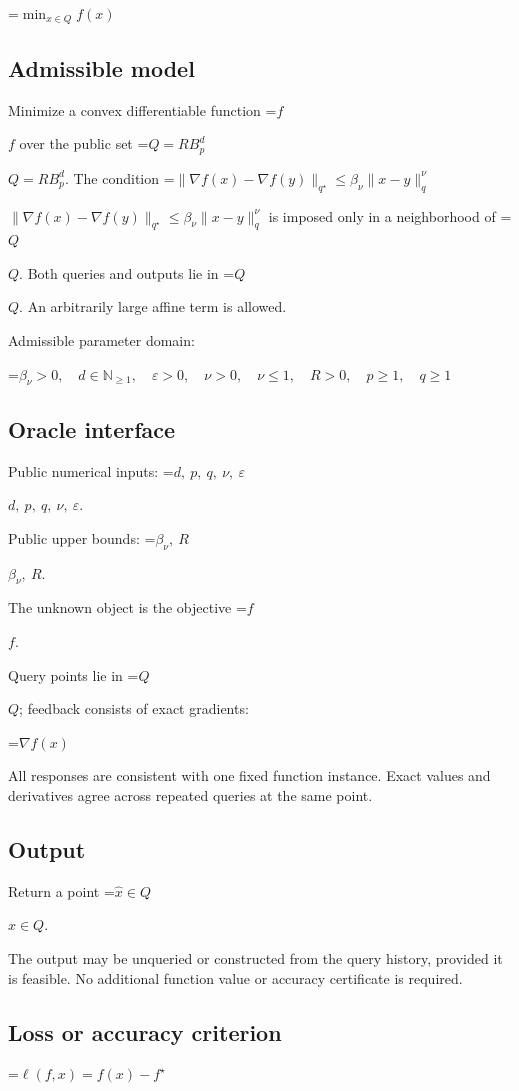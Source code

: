 \documentclass[10pt,a4paper]{article}
\newcommand{\AtlasMath}[1]{\par\begingroup\centering\setbox0=\hbox{$\displaystyle #1$}\ifdim\wd0>1.4\linewidth\typeout{ATLAS WIDE FORMULA: \the\wd0}\fi\ifdim\wd0>\linewidth\resizebox{\linewidth}{!}{\box0}\else\box0\fi\par\endgroup}
\newcommand{\AtlasInlineMath}[1]{\begingroup\setbox0=\hbox{$#1$}\ifdim\wd0>.4\linewidth\endgroup\AtlasMath{#1}\else\endgroup$#1$\fi}
\begin{document}
\AtlasMath{\min_{x\in Q}f(x)}


\subsection{Admissible model}
Minimize a convex differentiable function \AtlasInlineMath{f} over the public set \AtlasInlineMath{Q=RB_p^d}. The condition \AtlasInlineMath{\|\nabla f(x)-\nabla f(y)\|_{q^\star}\le\beta_\nu\|x-y\|_q^\nu} is imposed only in a neighborhood of \AtlasInlineMath{Q}. Both queries and outputs lie in \AtlasInlineMath{Q}. An arbitrarily large affine term is allowed.

Admissible parameter domain:


\AtlasMath{\beta_\nu>0,\quad d\in\mathbb{N}_{\ge1},\quad \varepsilon>0,\quad \nu>0,\quad \nu\le1,\quad R>0,\quad p\ge1,\quad q\ge1}


\subsection{Oracle interface}
Public numerical inputs: \AtlasInlineMath{d,\ p,\ q,\ \nu,\ \varepsilon}.

Public upper bounds: \AtlasInlineMath{\beta_\nu,\ R}.

The unknown object is the objective \AtlasInlineMath{f}.

Query points lie in \AtlasInlineMath{Q}; feedback consists of exact gradients:


\AtlasMath{\nabla f(x)}


All responses are consistent with one fixed function instance. Exact values and derivatives agree across repeated queries at the same point.

\subsection{Output}
Return a point \AtlasInlineMath{\widehat x\in Q}.

The output may be unqueried or constructed from the query history, provided it is feasible. No additional function value or accuracy certificate is required.

\subsection{Loss or accuracy criterion}

\AtlasMath{\ell(f,x)=f(x)-f^\star}
\end{document}
